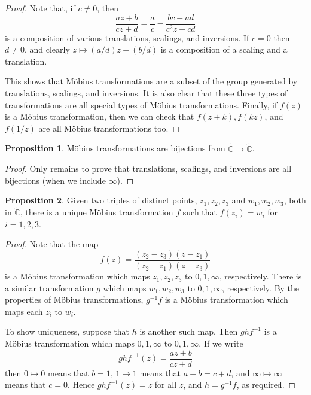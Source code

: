 \documentclass[10pt,fleqn]{article}
\newcommand{\comps}{\mathbb{C}}
\theoremstyle{definition} \newtheorem{defn}{Definition}[section]
\theoremstyle{plain}      \newtheorem{thm}[defn]{Theorem}
\theoremstyle{definition} \newtheorem{prop}[defn]{Proposition}
\theoremstyle{plain}      \newtheorem{lem}[defn]{Lemma}
\theoremstyle{definition} \newtheorem{cor}[defn]{Corollary}
\theoremstyle{definition} \newtheorem{ex}[defn]{Example}
\theoremstyle{definition} \newtheorem{rem}[defn]{Remark}
\begin{document}
\begin{proof}
    Note that, if $c\neq0$, then
    \[
        \frac{az+b}{cz+d}=
        \frac{a}{c}-\frac{bc-ad}{c^2z+cd}
    \]
    is a composition of various translations, scalings, and inversions.
    If $c=0$ then $d\neq0$, and clearly $z\mapsto(a/d)z+(b/d)$ is a composition of a scaling and a translation.

    This shows that M\"obius transformations are a subset of the group generated by translations, scalings, and inversions.
    It is also clear that these three types of transformations are all special types of M\"obius transformations.
    Finally, if $f(z)$ is a M\"obius transformation, then we can check that $f(z+k),f(kz)$, and $f(1/z)$ are all M\"obius transformations too.
\end{proof}

\begin{prop}
    M\"obius transformations are bijections from $\tilde{\comps}\to\tilde{\comps}$.
\end{prop}

\begin{proof}
    Only remains to prove that translations, scalings, and inversions are all bijections (when we include $\infty$).
\end{proof}

\begin{prop}
    Given two triples of distinct points, $z_1,z_2,z_3$ and $w_1,w_2,w_3$, both in $\tilde{\comps}$, there is a unique M\"obius transformation $f$ such that $f(z_i)=w_i$ for $i=1,2,3$.
\end{prop}

\begin{proof}
    Note that the map
    \[
        f(z)=
        \frac{(z_2-z_3)(z-z_1)}{(z_2-z_1)(z-z_3)}
    \]
    is a M\"obius transformation which maps $z_1,z_2,z_3$ to $0,1,\infty$, respectively.
    There is a similar transformation $g$ which maps $w_1,w_2,w_3$ to $0,1,\infty$, respectively.
    By the properties of M\"obius transformations, $g^{-1}f$ is a M\"obius transformation which maps each $z_i$ to $w_i$.

    To show uniqueness, suppose that $h$ is another such map.
    Then $ghf^{-1}$ is a M\"obius transformation which maps $0,1,\infty$ to $0,1,\infty$.
    If we write
    \[
        ghf^{-1}(z)=
        \frac{az+b}{cz+d}
    \]
    then $0\mapsto0$ means that $b=1$, $1\mapsto1$ means that $a+b=c+d$, and $\infty\mapsto\infty$ means that $c=0$.
    Hence $ghf^{-1}(z)=z$ for all $z$, and $h=g^{-1}f$, as required.
\end{proof}
\end{document}
